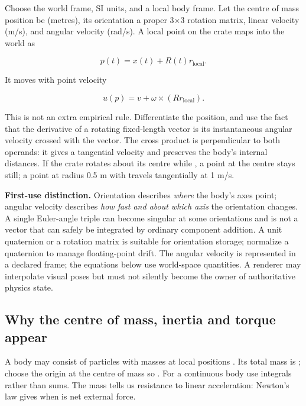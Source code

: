 Choose the world frame, SI units, and a local body frame. Let the centre of mass position be  (metres), its orientation  a proper 3×3 rotation matrix, linear velocity  (m/s), and angular velocity  (rad/s). A local point  on the crate maps into the world as

\[
p(t)=x(t)+R(t)r_{\mathrm{local}}.
\]

It moves with point velocity

\[
u(p)=v+\omega\times(Rr_{\mathrm{local}}).
\]

This is not an extra empirical rule. Differentiate the position, and use the fact that the derivative of a rotating fixed-length vector is its instantaneous angular velocity crossed with the vector. The cross product is perpendicular to both operands: it gives a tangential velocity and preserves the body's internal distances. If the crate rotates about its centre while , a point at the centre stays still; a point at radius 0.5 m with  travels tangentially at 1 m/s.

\textbf{First-use distinction.} Orientation describes \emph{where} the body's axes point; angular velocity describes \emph{how fast and about which axis} the orientation changes. A single Euler-angle triple can become singular at some orientations and is not a vector that can safely be integrated by ordinary component addition. A unit quaternion or a rotation matrix is suitable for orientation storage; normalize a quaternion to manage floating-point drift. The angular velocity is represented in a declared frame; the equations below use world-space quantities. A renderer may interpolate visual poses but must not silently become the owner of authoritative physics state.

\subsection{Why the centre of mass, inertia and torque appear}\label{06-engine-ii-ch033-why-the-centre-of-mass-inertia-and-torque-appear}

\hypertarget{06-engine-ii-ch033-why-the-centre-of-mass-inertia-and-torque-appear}{}

A body may consist of particles with masses  at local positions . Its total mass is ; choose the origin at the centre of mass so . For a continuous body use integrals rather than sums. The mass tells us resistance to linear acceleration: Newton's law gives  when  is net external force.

